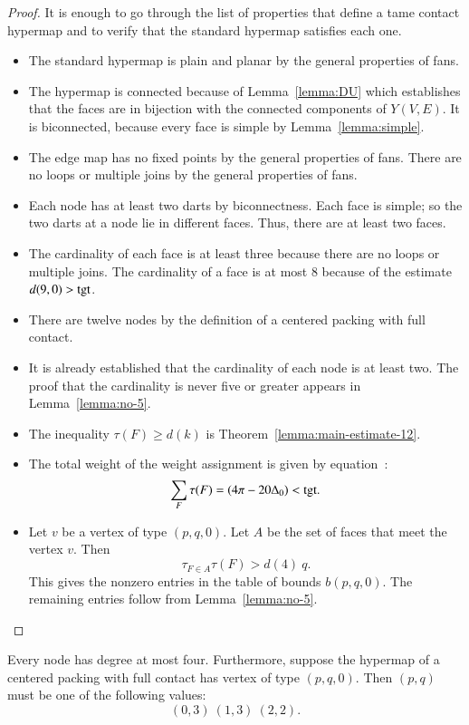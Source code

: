 \begin{proof}  It is enough to go through the list of properties that define a tame contact hypermap and to verify that the standard hypermap satisfies each one.

\begin{itemize}
\item The standard hypermap is plain and planar by the general properties of fans.
\item The hypermap is connected because of Lemma~\ref{lemma:DU} which establishes that the faces are in bijection with the connected components of $Y(V,E)$.  It is biconnected, because every face is simple by Lemma~\ref{lemma:simple}.
%
\item The edge map has no fixed points by the general properties of fans.  There are no loops or multiple joins by the general properties of fans.
\item  Each node has at least two darts by biconnectness. Each face is simple; so the two darts at a node lie in different faces.  Thus, there are at least two faces.
\item The cardinality of each face is at least three because there are no loops or multiple joins.  The cardinality of a face is at most $8$ because of the estimate $d(9,0)>{\operatorname{tgt}}$.  
\item There are twelve nodes by the definition of a centered packing with full contact.
\item It is already established that the cardinality of each node is at least two.  The proof that the cardinality is never five or greater appears in Lemma~\ref{lemma:no-5}.
\item The inequality $\tau(F)\ge d(k)$ is Theorem~\ref{lemma:main-estimate-12}.
%
\item The total weight of the weight assignment is given by equation~:
$$
\sum_F \tau(F) = (4\pi - 20\Delta_0) < {\operatorname{tgt}}.
$$
%
\item Let $v$ be a vertex of type $(p,q,0)$.  Let $A$ be the set of faces that meet the vertex $v$. Then 
$$
\tau_{F\in A}\tau(F) > d(4)~q.
$$
This gives the nonzero entries in the table of bounds $b(p,q,0)$.  The remaining entries follow from Lemma~\ref{lemma:no-5}.
\end{itemize}
\end{proof}




\begin{lemma}\label{lemma:no-5} 
Every node has degree at most four.
Furthermore, suppose the hypermap of a centered packing with full contact has vertex of type $(p,q,0)$.  Then $(p,q)$ must be one of the following values:
$$
(0,3)~(1,3)~(2,2).
$$
\end{lemma}

